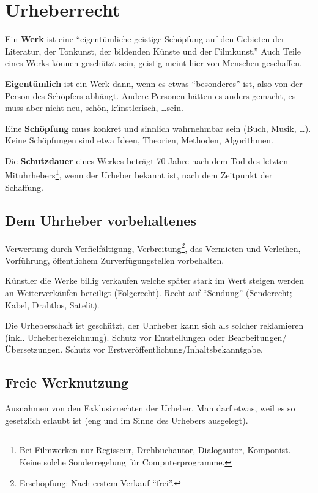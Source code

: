 \documentclass[twocolumn]{article}
\newcommand{\term}[1]{\textbf{#1}}
\newcommand{\separator}{\vspace{0.5em}\noindent}
\begin{document}
\section{Urheberrecht}

Ein \term{Werk} ist eine \enquote{eigentümliche geistige Schöpfung auf den Gebieten der Literatur, der Tonkunst, der bildenden Künste und der Filmkunst.} Auch Teile eines Werks können geschützt sein, geistig meint hier von Menschen geschaffen.

\separator
\term{Eigentümlich} ist ein Werk dann, wenn es etwas \enquote{besonderes} ist, also von der Person des Schöpfers abhängt. Andere Personen hätten es anders gemacht, es muss aber nicht neu, schön, künstlerisch, \ldots sein.

\separator
Eine \term{Schöpfung} muss konkret und sinnlich wahrnehmbar sein (Buch, Musik, \ldots). Keine Schöpfungen sind etwa Ideen, Theorien, Methoden, Algorithmen.

\separator
Die \term{Schutzdauer} eines Werkes beträgt 70 Jahre nach dem Tod des letzten Mituhrhebers\footnote{Bei Filmwerken nur Regisseur, Drehbuchautor, Dialogautor, Komponist. Keine solche Sonderregelung für Computerprogramme.}, wenn der Urheber bekannt ist, nach dem Zeitpunkt der Schaffung.

\subsection{Dem Uhrheber vorbehaltenes}
\label{ssec:uhrheber-vorbehalten}

Verwertung durch Verfielfältigung, Verbreitung\footnote{Erschöpfung: Nach erstem Verkauf \enquote{frei}.}, das Vermieten und Verleihen, Vorführung, öffentlichem Zurverfügungstellen vorbehalten.

Künstler die Werke billig verkaufen welche später stark im Wert steigen werden an Weiterverkäufen beteiligt (Folgerecht). Recht auf \enquote{Sendung} (Senderecht; Kabel, Drahtlos, Satelit).

Die Urheberschaft ist geschützt, der Uhrheber kann sich als solcher reklamieren (inkl. Urheberbezeichnung). Schutz vor Entstellungen oder Bearbeitungen/Übersetzungen. Schutz vor Erstveröffentlichung/Inhaltsbekanntgabe.

\subsection{Freie Werknutzung}

Ausnahmen von den Exklusivrechten der Urheber. Man darf etwas, weil es so gesetzlich erlaubt ist (eng und im Sinne des Urhebers ausgelegt).
\end{document}
